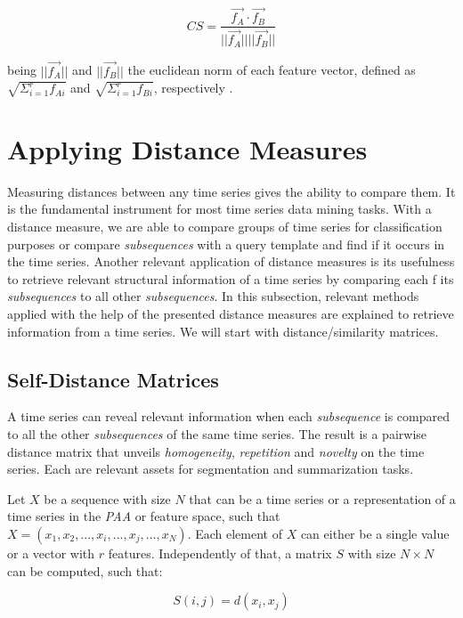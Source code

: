 \begin{equation}
CS = \frac{\vec{f_A} \cdot \vec{f_B}}{||\vec{f_A}|| ||\vec{f_B}||}
\end{equation}

being $||\vec{f_A}||$ and $||\vec{f_B}||$ the euclidean norm of each feature vector, defined as $\sqrt{\Sigma_{i=1}^{r} f_{Ai}}$ and $\sqrt{\Sigma_{i=1}^{r} f_{Bi}}$, respectively \cite{cosine}.


\section{Applying Distance Measures}
\label{sec:dist_measures}

Measuring distances between any time series gives the ability to compare them. It is the fundamental instrument for most time series data mining tasks. With a distance measure, we are able to compare groups of time series for classification purposes or compare \textit{subsequences} with a query template and find if it occurs in the time series. Another relevant application of distance measures is its usefulness to retrieve relevant structural information of a time series by comparing each f its \textit{subsequences} to all other \textit{subsequences}. In this subsection, relevant methods applied with the help of the presented distance measures are explained to retrieve information from a time series. We will start with distance/similarity matrices.

\subsection{Self-Distance Matrices}
\label{subsec:dist_matrix}

A time series can reveal relevant information when each \textit{subsequence} is compared to all the other \textit{subsequences} of the same time series. The result is a pairwise distance matrix that unveils \textit{homogeneity}, \textit{repetition} and \textit{novelty} on the time series. Each are relevant assets for segmentation and summarization tasks.
\par
Let $X$ be a sequence with size $N$ that can be a time series or a representation of a time series in the \textit{PAA} or feature space, such that $X = (x_1, x_2, ..., x_i, ..., x_j, ..., x_N)$. Each element of $X$ can either be a single value or a vector with $r$ features. Independently of that, a matrix $S$ with size $N \times N$ can be computed, such that:

\begin{equation}
S(i,j)= d(x_i, x_j) 
\end{equation}

